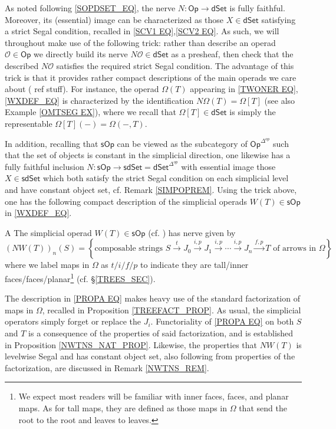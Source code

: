 \documentclass[a4paper,10pt
,draft
]{article}%
\numberwithin{equation}{section}
\numberwithin{figure}{section}
\theoremstyle{definition} %
\newcommand{\Op}{\mathsf{Op}}%
\newcommand{\sOp}{\ensuremath{\mathsf{sOp}}}%
\renewcommand{\O}{\ensuremath{\mathcal O}}
\newcommand{\1}{\ensuremath{\mathbbm 1}}%
\begin{document}
As noted following \eqref{SOPDSET_EQ},
the nerve $N\colon \mathsf{Op} \to \mathsf{dSet}$
is fully faithful.
Moreover, its (essential) image
can be characterized as those 
$X \in \mathsf{dSet}$ satisfying a strict Segal condition,
recalled in \eqref{SCV1 EQ},\eqref{SCV2 EQ}.
As such, we will throughout make use of the following trick:
rather than describe an operad $\O \in \mathsf{Op}$
we directly build its nerve 
$N\O \in \mathsf{dSet}$ as a presheaf,
then check that the described $N\O$ satisfies the required strict Segal condition.
The advantage of this trick is that it provides rather compact descriptions of the main operads we care about ({\color{red} ref stuff}).
For instance, 
the operad $\Omega(T)$ appearing in 
\eqref{TWONER EQ},\eqref{WXDEF_EQ}
is characterized by the identification $N\Omega(T) =\Omega[T]$
(see also Example \ref{OMTSEG EX}), 
where we recall that $\Omega[T]\in \mathsf{dSet}$
is simply the representable $\Omega[T](-) = \Omega(-,T)$.


In addition, recalling that $\sOp$ can be viewed as the subcategory
of $\Op^{\Delta^{op}}$ such that the set of objects is constant in the simplicial direction,
one likewise has a fully faithful inclusion
$N\colon \sOp \to \mathsf{sdSet} = \mathsf{dSet}^{\Delta^{op}}$
with essential image those
$X \in \mathsf{sdSet}$
which both satisfy the strict Segal condition on each simplicial level and have constant object set, 
cf. Remark \ref{SIMPOPREM}.
Using the trick above,
one has the following compact description
of the simplicial operads $W(T) \in \sOp$ in \eqref{WXDEF_EQ}.

\begin{customprop}{A}\label{PROPA PROP}
The simplicial operad $W(T) \in \sOp$
(cf. \cite[(4.1)]{CM13b})
has nerve given by
\begin{equation}\label{PROPA EQ}
	\left(NW(T)\right)_{n}(S)
=
	\left\{
	\text{composable strings }
	S \xrightarrow{t} 
	J_0 \xrightarrow{i,p} 
	J_1 \xrightarrow{i,p} 
	\cdots \xrightarrow{i,p}
	J_n \xrightarrow{f,p}
	T
	\text{ of arrows in $\Omega$}
\right\}
\end{equation}
where we label maps in $\Omega$ as
$t/i/f/p$
to indicate they are 
tall/inner faces/faces/planar\footnote{
We expect most readers will be familiar with inner faces, faces, and planar maps. 
As for tall maps, they are defined 
as those maps in $\Omega$
that send the root to the root and leaves to leaves.
}
(cf. \S \ref{TREES_SEC}).
\end{customprop}
The description in \eqref{PROPA EQ}
makes heavy use of the standard factorization of maps in $\Omega$,
recalled in Proposition \ref{TREEFACT_PROP}.
As usual, the simplicial operators simply forget or replace the $J_i$.
Functoriality of \eqref{PROPA EQ} on both $S$ and $T$
is a consequence of the properties of said factorization,
and is established in Proposition \ref{NWTNS_NAT_PROP}.
Likewise, the properties that 
$NW(T)$ is levelwise Segal and 
has constant object set, also following from properties of the factorization, are discussed in Remark \ref{NWTNS_REM}.
\end{document}
